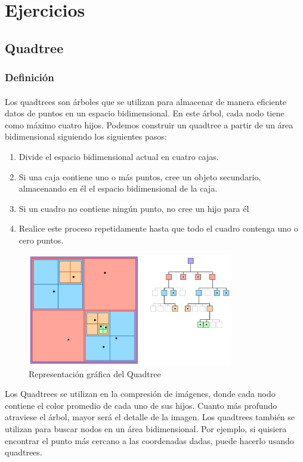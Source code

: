 \documentclass{article}
\begin{document}
	\section{Ejercicios}
   \subsection{Quadtree}
   \subsubsection{Definición}
        \paragraph{}
        Los quadtrees son árboles que se utilizan para almacenar de manera eficiente datos de puntos en un espacio bidimensional. En este árbol, cada nodo tiene como máximo cuatro hijos. Podemos construir un quadtree a partir de un área bidimensional siguiendo los siguientes pasos:
\begin{enumerate}
\item Divide el espacio bidimensional actual en cuatro cajas.
\item Si una caja contiene uno o más puntos, cree un objeto secundario, almacenando en él el espacio bidimensional de la caja.
\item Si un cuadro no contiene ningún punto, no cree un hijo para él
\item Realice este proceso repetidamente hasta que todo el cuadro contenga uno o cero puntos.
\end{enumerate}
\begin{figure}[htbp]
              \centering
              \includegraphics[width=0.8\textwidth]{img/quadtree.png}
              \caption{Representación gráfica del Quadtree}
              \label{fig:quadtree}
            \end{figure}
Los Quadtrees se utilizan en la compresión de imágenes, donde cada nodo contiene el color promedio de cada uno de sus hijos. Cuanto más profundo atraviese el árbol, mayor será el detalle de la imagen. Los quadtrees también se utilizan para buscar nodos en un área bidimensional. Por ejemplo, si quisiera encontrar el punto más cercano a las coordenadas dadas, puede hacerlo usando quadtrees.
\end{document}
